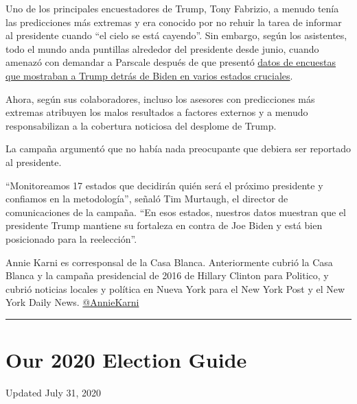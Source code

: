 Uno de los principales encuestadores de Trump, Tony Fabrizio, a menudo
tenía las predicciones más extremas y era conocido por no rehuir la
tarea de informar al presidente cuando ``el cielo se está cayendo''. Sin
embargo, según los asistentes, todo el mundo anda puntillas alrededor
del presidente desde junio, cuando amenazó con demandar a Parscale
después de que presentó
\href{https://www.nytimes.com/2020/04/29/us/politics/trump-campaign-reelection-polls.html}{datos
de encuestas que mostraban a Trump detrás de Biden en varios estados
cruciales}.

Ahora, según sus colaboradores, incluso los asesores con predicciones
más extremas atribuyen los malos resultados a factores externos y a
menudo responsabilizan a la cobertura noticiosa del desplome de Trump.

La campaña argumentó que no había nada preocupante que debiera ser
reportado al presidente.

``Monitoreamos 17 estados que decidirán quién será el próximo presidente
y confiamos en la metodología'', señaló Tim Murtaugh, el director de
comunicaciones de la campaña. ``En esos estados, nuestros datos muestran
que el presidente Trump mantiene su fortaleza en contra de Joe Biden y
está bien posicionado para la reelección''.

Annie Karni es corresponsal de la Casa Blanca. Anteriormente cubrió la
Casa Blanca y la campaña presidencial de 2016 de Hillary Clinton para
Politico, y cubrió noticias locales y política en Nueva York para el New
York Post y el New York Daily News.
\href{https://twitter.com/AnnieKarni}{@AnnieKarni}

\begin{center}\rule{0.5\linewidth}{\linethickness}\end{center}

\hypertarget{our-2020-election-guide}{%
\section{Our 2020 Election Guide}\label{our-2020-election-guide}}

Updated July 31, 2020


